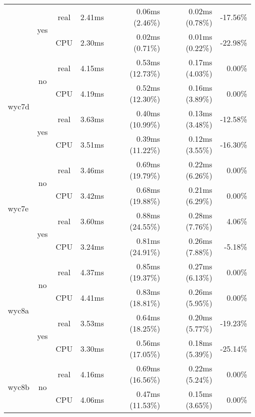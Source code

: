 \documentclass[en]{pracamgr}
\begin{document}
\begin{appendices}
\begin{small}
\begin{longtable}{|l|c|c|r|r|r|r|}
                          \cline{2-7}
                          & \multirow{2}{*}{yes} & real & 2.41ms & 0.06ms (2.46\%) & 0.02ms (0.78\%) & -17.56\% \\*
                          &                      & CPU  & 2.30ms & 0.02ms (0.71\%) & 0.01ms (0.22\%) & -22.98\% \\
\hline
\multirow{4}{*}{wyc7d}    & \multirow{2}{*}{no}  & real & 4.15ms & 0.53ms (12.73\%) & 0.17ms (4.03\%) & 0.00\% \\*
                          &                      & CPU  & 4.19ms & 0.52ms (12.30\%) & 0.16ms (3.89\%) & 0.00\% \\*
                          \cline{2-7}
                          & \multirow{2}{*}{yes} & real & 3.63ms & 0.40ms (10.99\%) & 0.13ms (3.48\%) & -12.58\% \\*
                          &                      & CPU  & 3.51ms & 0.39ms (11.22\%) & 0.12ms (3.55\%) & -16.30\% \\
\hline
\multirow{4}{*}{wyc7e}    & \multirow{2}{*}{no}  & real & 3.46ms & 0.69ms (19.79\%) & 0.22ms (6.26\%) & 0.00\% \\*
                          &                      & CPU  & 3.42ms & 0.68ms (19.88\%) & 0.21ms (6.29\%) & 0.00\% \\*
                          \cline{2-7}
                          & \multirow{2}{*}{yes} & real & 3.60ms & 0.88ms (24.55\%) & 0.28ms (7.76\%) & 4.06\% \\*
                          &                      & CPU  & 3.24ms & 0.81ms (24.91\%) & 0.26ms (7.88\%) & -5.18\% \\
\hline
\multirow{4}{*}{wyc8a}    & \multirow{2}{*}{no}  & real & 4.37ms & 0.85ms (19.37\%) & 0.27ms (6.13\%) & 0.00\% \\*
                          &                      & CPU  & 4.41ms & 0.83ms (18.81\%) & 0.26ms (5.95\%) & 0.00\% \\*
                          \cline{2-7}
                          & \multirow{2}{*}{yes} & real & 3.53ms & 0.64ms (18.25\%) & 0.20ms (5.77\%) & -19.23\% \\*
                          &                      & CPU  & 3.30ms & 0.56ms (17.05\%) & 0.18ms (5.39\%) & -25.14\% \\
\hline
\multirow{4}{*}{wyc8b}    & \multirow{2}{*}{no}  & real & 4.16ms & 0.69ms (16.56\%) & 0.22ms (5.24\%) & 0.00\% \\*
                          &                      & CPU  & 4.06ms & 0.47ms (11.53\%) & 0.15ms (3.65\%) & 0.00\% \\*

\end{longtable}
\end{small}
\end{appendices}
\end{document}
